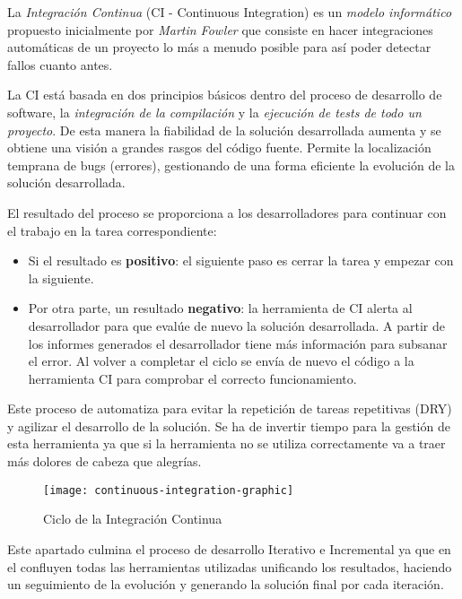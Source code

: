 \par La \emph{Integración Continua} (CI - Continuous Integration) es un \emph{modelo informático} propuesto inicialmente por \emph{Martin Fowler} que consiste en hacer integraciones automáticas de un proyecto lo más a menudo posible para así poder detectar fallos cuanto antes.

\par La CI está basada en dos principios básicos dentro del proceso de desarrollo de software, la \emph{integración de la compilación} y la \emph{ejecución de tests de todo un proyecto}. De esta manera la fiabilidad de la solución desarrollada aumenta y se obtiene una visión a grandes rasgos del código fuente. Permite la localización temprana de bugs (errores), gestionando de una forma eficiente la evolución de la solución desarrollada.

\par El resultado del proceso se proporciona a los desarrolladores para continuar con el trabajo en la tarea correspondiente:

\begin{itemize}
	\item Si el resultado es \textbf{positivo}: el siguiente paso es cerrar la tarea y empezar con la siguiente.
	\item Por otra parte, un resultado \textbf{negativo}: la herramienta de CI alerta al desarrollador para que evalúe de nuevo la solución desarrollada. A partir de los informes generados el desarrollador tiene más información para subsanar el error. Al volver a completar el ciclo se envía de nuevo el código a la herramienta CI para comprobar el correcto funcionamiento.
\end{itemize}

\par Este proceso de automatiza para evitar la repetición de tareas repetitivas (DRY) y agilizar el desarrollo de la solución. Se ha de invertir tiempo para la gestión de esta herramienta ya que si la herramienta no se utiliza correctamente va a traer más dolores de cabeza que alegrías.

\begin{figure}[H]
    \centering
    \texttt{[image: continuous-integration-graphic]}
    \caption{Ciclo de la Integración Continua}
    \label{fig:continuous-integration-graphic}
\end{figure}

\par Este apartado culmina el proceso de desarrollo Iterativo e Incremental ya que en el confluyen todas las herramientas utilizadas unificando los resultados, haciendo un seguimiento de la evolución y generando la solución final por cada iteración.

